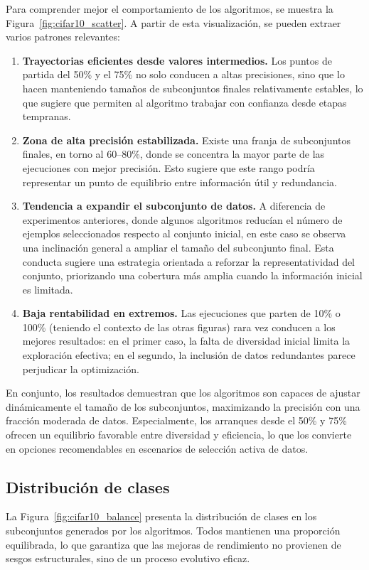 Para comprender mejor el comportamiento de los algoritmos, se muestra la Figura~\ref{fig:cifar10_scatter}.
A partir de esta visualización, se pueden extraer varios patrones relevantes:

\begin{enumerate}
    \item \textbf{Trayectorias eficientes desde valores intermedios.} Los puntos de partida del 50\% y el 75\% no solo conducen a altas precisiones,
          sino que lo hacen manteniendo tamaños de subconjuntos finales relativamente estables, lo que sugiere que permiten al algoritmo trabajar con confianza desde etapas tempranas.
    \item \textbf{Zona de alta precisión estabilizada.} Existe una franja de subconjuntos finales, en torno al 60--80\%,
          donde se concentra la mayor parte de las ejecuciones con mejor precisión.
          Esto sugiere que este rango podría representar un punto de equilibrio entre información útil y redundancia.
    \item \textbf{Tendencia a expandir el subconjunto de datos.} A diferencia de experimentos anteriores,
          donde algunos algoritmos reducían el número de ejemplos seleccionados respecto al conjunto inicial,
          en este caso se observa una inclinación general a ampliar el tamaño del subconjunto final.
          Esta conducta sugiere una estrategia orientada a reforzar la representatividad del conjunto,
          priorizando una cobertura más amplia cuando la información inicial es limitada.
    \item \textbf{Baja rentabilidad en extremos.} Las ejecuciones que parten de 10\% o 100\% (teniendo el contexto de las otras figuras)
          rara vez conducen a los mejores resultados: en el primer caso, la falta de diversidad inicial limita la exploración efectiva; en el segundo,
          la inclusión de datos redundantes parece perjudicar la optimización.
\end{enumerate}

En conjunto, los resultados demuestran que los algoritmos son capaces de ajustar dinámicamente el tamaño de los subconjuntos, maximizando la precisión con una fracción moderada de datos.
Especialmente, los arranques desde el 50\% y 75\% ofrecen un equilibrio favorable entre diversidad y eficiencia,
lo que los convierte en opciones recomendables en escenarios de selección activa de datos.

\subsection{Distribución de clases}
La Figura~\ref{fig:cifar10_balance} presenta la distribución de clases en los subconjuntos generados por los algoritmos.
Todos mantienen una proporción equilibrada, lo que garantiza que las mejoras de rendimiento no provienen de sesgos estructurales, sino de un proceso evolutivo eficaz.

